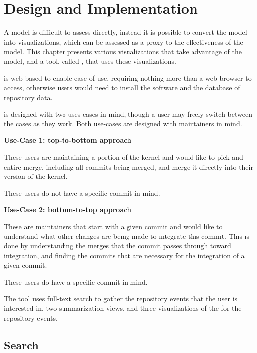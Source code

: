\chapter{Design and Implementation}\label{chap:design_and_implementation}

A model is difficult to assess directly, instead it is possible to
convert the model into visualizations, which can be assessed as a proxy
to the effectiveness of the model. This chapter presents various
visualizations that take advantage of the \mt{} model, and a tool,
called \tool{}, that uses these visualizations.

\tool{} is web-based to enable ease of use, requiring nothing more than
a web-browser to access, otherwise users would need to install the
software and the database of repository data.

\tool{} is designed with two uses-cases in mind, though a user may
freely switch between the cases as they work. Both use-cases are
designed with maintainers in mind.

\begin{textbox}
  \textbf{Use-Case 1: top-to-bottom approach}

  These users are maintaining a portion of the kernel and would like to
  pick and entire merge, including all commits being merged, and merge
  it directly into their version of the kernel.

  These users do not have a specific commit in mind.
\end{textbox}

\begin{textbox}
  \textbf{Use-Case 2: bottom-to-top approach}

  These are maintainers that start with a given commit and would like to
  understand what other changes are being made to integrate this commit.
  This is done by understanding the merges that the commit passes
  through toward integration, and finding the commits that are necessary
  for the integration of a given commit.

  These users do have a specific commit in mind.
\end{textbox}

The tool uses full-text search to gather the repository events that the
user is interested in, two summarization views, and three visualizations
of the \mt{} for the repository events.

\section{Search}\label{sec:search}

